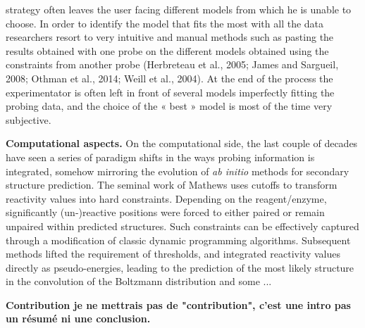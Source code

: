 \documentclass[a4,center,fleqn]{NAR}
\newcommand{\Blabla}[1][5-6]{{\color{blue!40!white}\lipsum*[#1]}}
\begin{document}
strategy often leaves the user facing different models from which he is unable to choose. In order to identify the model that fits the most with all the data researchers resort to very intuitive and manual methods such as pasting the results obtained with one probe on the different models obtained using the constraints from another probe (Herbreteau et al., 2005; James and Sargueil, 2008; Othman et al., 2014; Weill et al., 2004). At the end of the process the experimentator is often left in front of several models imperfectly fitting the probing data, and the choice of the « best » model is most of the time very subjective. 


{\noindent\bf Computational aspects.}
On the computational side, the last couple of decades have seen a series of paradigm shifts in the ways probing information is integrated, somehow mirroring the evolution of {\em ab initio} methods for secondary structure prediction. The seminal work of Mathews uses cutoffs to transform reactivity values into hard constraints. Depending on the reagent/enzyme, significantly (un-)reactive positions were forced to either paired or remain unpaired within predicted structures. Such constraints can be effectively captured through a modification of classic dynamic programming algorithms. Subsequent methods lifted the requirement of thresholds, and integrated reactivity values directly as pseudo-energies, leading to the prediction of the most likely structure in the convolution of the Boltzmann distribution and some ...

{\noindent\bf Contribution je ne mettrais pas de "contribution", c'est une intro pas un résumé ni une conclusion.}
\Blabla[7-8]

\end{document}
